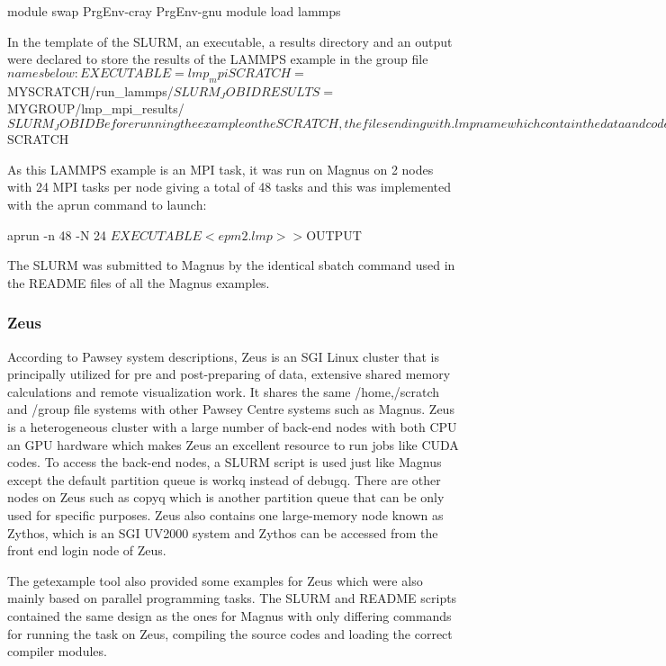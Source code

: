 \documentclass[journal]{IEEEtran}
\begin{document}
module swap PrgEnv-cray PrgEnv-gnu
module load lammps

In the template of the SLURM, an executable, a results directory and an output were declared to store the results of the LAMMPS example in the group file$
names below:

EXECUTABLE=lmp_mpi
SCRATCH=$MYSCRATCH/run_lammps/$SLURM_JOBID
RESULTS=$MYGROUP/lmp_mpi_results/$SLURM_JOBID

Before running the example on the SCRATCH, the files ending with .lmp name which contain the data and code were copied to the SCRACTH and this was
obtained in the SLURM as:

cp *.lmp $SCRATCH

As this LAMMPS example is an MPI task, it was run on Magnus on 2 nodes with 24 MPI tasks per node giving a total of 48 tasks and this was implemented
with the aprun command to launch:

aprun -n 48 -N 24 $EXECUTABLE < epm2.lmp >> ${OUTPUT}

The SLURM was submitted to Magnus by the identical sbatch command used in the README files of all the Magnus examples.


\subsubsection{Zeus}

According to Pawsey system descriptions, Zeus is an SGI Linux cluster that is principally utilized for pre and post-preparing of data, extensive shared 
memory calculations and remote visualization work. It shares the same /home,/scratch and /group file systems with other Pawsey Centre systems such as 
Magnus. Zeus is a heterogeneous cluster with a large number of back-end nodes with both CPU an GPU hardware which makes Zeus an excellent resource to run
jobs like CUDA codes. To access the back-end nodes, a SLURM script is used just like Magnus except the default partition queue is workq instead of 
debugq. There are other nodes on Zeus such as copyq which is another partition queue that can be only used for specific purposes. Zeus also contains one 
large-memory node known as Zythos, which is an SGI UV2000 system and Zythos can be accessed from the front end login node of
Zeus. 

The getexample tool also provided some examples for Zeus which were also mainly based on parallel programming tasks. The SLURM and README scripts
contained the same design as the ones for Magnus with only differing commands for running the task on Zeus, compiling the source codes and loading the
correct compiler modules. 
 
\end{document}
